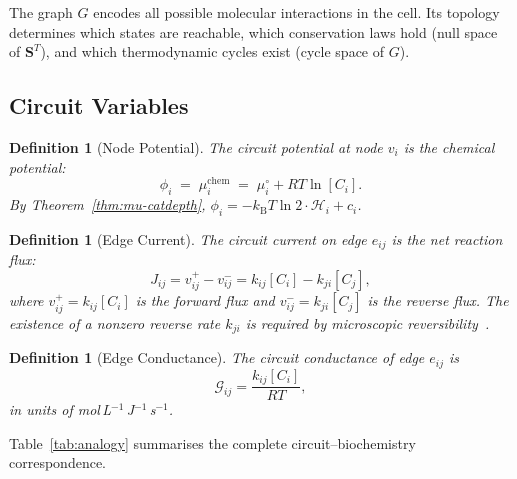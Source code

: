 \documentclass[twocolumn,10pt,a4paper]{article}
\newcommand{\kB}{k_{\mathrm{B}}}
\newcommand{\Hcat}{\mathcal{H}}
\newcommand{\Gcond}{\mathcal{G}}
\newtheorem{definition}[theorem]{Definition}
\begin{document}
The graph $G$ encodes all possible molecular interactions in the cell.  Its
topology determines which states are reachable, which conservation laws hold
(null space of $\mathbf{S}^T$), and which thermodynamic cycles exist (cycle
space of $G$).

\subsection{Circuit Variables}
\label{sec:circuit-vars}

\begin{definition}[Node Potential]
\label{def:potential}
The \emph{circuit potential} at node $v_i$ is the chemical potential:
\begin{equation}
  \phi_i \;=\; \mu_i^{\mathrm{chem}} \;=\; \mu_i^\circ + RT\ln[C_i].
  \label{eq:potential}
\end{equation}
By Theorem~\ref{thm:mu-catdepth},
$\phi_i = -\kB T\ln 2\cdot\Hcat_i + c_i$.
\end{definition}

\begin{definition}[Edge Current]
\label{def:current}
The \emph{circuit current} on edge $e_{ij}$ is the net reaction flux:
\begin{equation}
  J_{ij} = v_{ij}^+ - v_{ij}^- = k_{ij}[C_i] - k_{ji}[C_j],
  \label{eq:current}
\end{equation}
where $v_{ij}^+=k_{ij}[C_i]$ is the forward flux and
$v_{ij}^-=k_{ji}[C_j]$ is the reverse flux.  The existence of a nonzero
reverse rate $k_{ji}$ is required by microscopic
reversibility~\cite{Wegscheider1901,Lewis1925,Onsager1931}.
\end{definition}

\begin{definition}[Edge Conductance]
\label{def:conductance}
The \emph{circuit conductance} of edge $e_{ij}$ is
\begin{equation}
  \Gcond_{ij} = \frac{k_{ij}[C_i]}{RT},
  \label{eq:conductance}
\end{equation}
in units of mol\,L$^{-1}$\,J$^{-1}$\,s$^{-1}$.
\end{definition}

Table~\ref{tab:analogy} summarises the complete circuit--biochemistry
correspondence.
\end{document}
